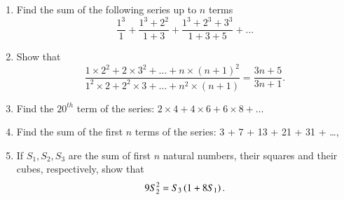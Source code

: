 \begin{enumerate}[label=\thesubsection.\arabic*,ref=\thesubsection.\theenumi]
\begin{enumerate}
\end{enumerate}
\item Find the sum of the following series up to $n$ terms
$$\frac{1^3}{1}+\frac{1^3+2^2}{1+3}+\frac{1^3+2^3+3^3}{1+3+5}+\dots$$
\item Show that $$\frac{1 \times 2^2+ 2 \times 3^2+\dots+n \times (n+1)^2}{1^2 \times 2 + 2^2 \times 3 +\dots+n^2 \times (n+1)} = \frac{3n+5}{3n+1}.$$
\item Find the $20^{th}$ term of the series: $2 \times 4 + 4 \times 6 + 6 \times 8 + \dots  $ 
\item Find the sum of the first $n$ terms of the series: 3 + 7 + 13 + 21 + 31 + \dots, 
\item If $S_1, S_2, S_3$ are the sum of first $n$ natural numbers, their squares and their cubes, respectively, show that $$9 S_2^2 = S_3 \left(1 + 8S_1\right).$$
\end{enumerate}
